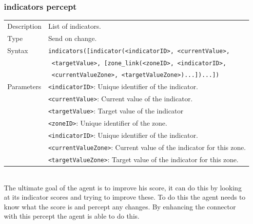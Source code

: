 	\subsubsection*{indicators percept}
		\begin{small}
			\begin{tabular}{p{2cm}p{9cm}}
				Description 	& List of indicators.\\
				Type 		& Send on change.\\
				Syntax 	& \verb|indicators([indicator(<indicatorID>, <currentValue>, |\\
						& \verb| <targetValue>, [zone_link(<zoneID>, <indicatorID>, |\\
						& \verb| <currentValueZone>, <targetValueZone>)...])...])|\\
				Parameters 	& \verb|<indicatorID>|: Unique identifier of the indicator.\\
						& \verb|<currentValue>|: Current value of the indicator.\\
						& \verb|<targetValue>|:  Target value of the indicator\\
						& \verb|<zoneID>|: Unique identifier of the zone.\\
						& \verb|<indicatorID>|:  Unique identifier of the indicator.\\
						& \verb|<currentValueZone>|:  Current value of the indicator for this zone.\\
						& \verb|<targetValueZone>|:  Target value of the indicator for this zone.\\
			\end{tabular}
		\end{small}
	\\The ultimate goal of the agent is to improve his score, it can do this by looking at its indicator scores and trying to improve these. To do this the agent needs to know what the score is and percept any changes. By enhancing the connector with this percept the agent is able to do this.

